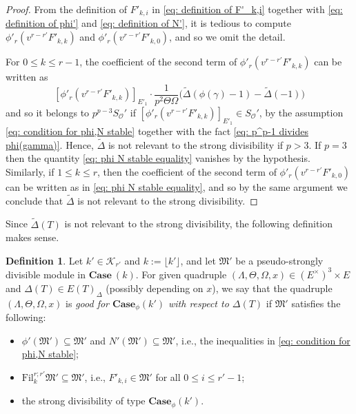 \documentclass[11pt]{amsart}
\theoremstyle{definition}
\numberwithin{equation}{subsection}
\theoremstyle{plain}
\theoremstyle{plain}
\theoremstyle{plain}
\theoremstyle{plain}
\theoremstyle{plain}
\theoremstyle{plain}
\theoremstyle{plain}
\theoremstyle{plain}
\theoremstyle{plain}
\theoremstyle{plain}
\theoremstyle{plain}
\theoremstyle{plain}
\theoremstyle{definition}
\newtheorem{defi}[equation]{Definition}
\theoremstyle{definition}
\theoremstyle{definition}
\theoremstyle{remark}
\renewcommand{\(}{\textup{(}}
\renewcommand{\)}{\textup{)}}
\newcommand{\fM}{\mathfrak{M}}
\newcommand{\Fil}{\mathrm{Fil}}
\newcommand{\cO}{\mathcal{O}}
\newcommand{\cK}{\mathcal{K}}
\begin{document}
\begin{proof}
From the definition of $F'_{k,i}$ in \eqref{eq: definition of F'_k,i} together with \eqref{eq: definition of phi'} and \eqref{eq: definition of N'}, it is tedious to compute $\phi'_r(v^{r-r'}F'_{k,k})$ and $\phi'_r(v^{r-r'}F'_{k,0})$, and so we omit the detail.

For $0\leq k\leq r-1$, the coefficient of the second term of $\phi'_r(v^{r-r'}F'_{k,k})$ can be written as
\begin{equation}\label{eq: phi N stable equality}
    [\phi'_r(v^{r-r'}F'_{k,k})]_{E'_1}\cdot \frac{1}{p^2\Theta\Omega}\big(
    \tilde\Delta(\phi(\gamma)-1)-\tilde\Delta(-1)
    \big)
\end{equation}
and so it belongs to $p^{p-3} S_\cO'$ if $[\phi'_r(v^{r-r'}F'_{k,k})]_{E'_1}\in S_\cO'$, by the assumption \eqref{eq: condition for phi,N stable} together with the fact \eqref{eq: p^p-1 divides phi(gamma)}. Hence, $\tilde{\Delta}$ is not relevant to the strong divisibility if $p> 3$. If $p=3$ then the quantity \eqref{eq: phi N stable equality} vanishes by the hypothesis. Similarly, if $1\leq k\leq r$, then the coefficient of the second term of $\phi'_r(v^{r-r'}F'_{k,0})$ can be written as in \eqref{eq: phi N stable equality}, and so by the same argument we conclude that $\tilde{\Delta}$ is not relevant to the strong divisibility.
\end{proof}




Since $\tilde{\Delta}(T)$ is not relevant to the strong divisibility, the following definition makes sense.
\begin{defi}
Let $k'\in\cK_{r'}$ and $k:=\lfloor k'\rfloor$, and let $\fM'$ be a pseudo-strongly divisible module in $\mathbf{Case}~(k)$. For given quadruple $(\Lambda,\Theta,\Omega,x)\in (E^\times)^3\times E$ and $\Delta(T)\in E(T)_\Delta$ (possibly depending on $x$), we say that the quadruple $(\Lambda,\Theta,\Omega,x)$ is \emph{good for $\mathbf{Case}_\phi(k')$ with respect to $\Delta(T)$} if $\fM'$ satisfies the following:
\begin{itemize}[leftmargin=*]
\item $\phi'(\fM')\subseteq \fM'$ and $N'(\fM')\subseteq\fM'$, i.e., the inequalities in \eqref{eq: condition for phi,N stable};
\item $\Fil^{r;r'}_k\fM'\subseteq\fM'$, i.e., $F'_{k,i}\in \fM'$ for all $0\leq i\leq r'-1$;
\item the strong divisibility of type $\mathbf{Case}_\phi(k')$.
\end{itemize}
\end{defi}
\end{document}
